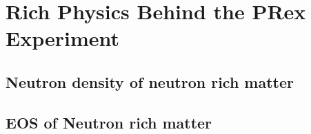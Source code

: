\section{Rich Physics Behind the PRex Experiment}
\subsection{Neutron density of neutron rich matter}
\subsection{EOS of Neutron rich matter}











